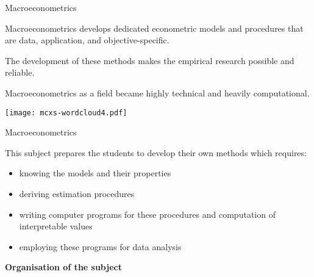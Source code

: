 \documentclass[notes,blackandwhite,mathsans]{beamer}
\begin{document}
{
\begin{frame}{\color{mcxs1}Macroeconometrics}

Macroeconometrics develops dedicated econometric models and procedures that are data, application, and objective-specific.

\bigskip The development of these methods makes the empirical research possible and reliable.
 
\bigskip Macroeconometrics as a field became highly technical and heavily computational.

\end{frame}
}





\begin{frame}

\texttt{[image: mcxs-wordcloud4.pdf]}

\end{frame}




{
\begin{frame}{\color{mcxs1}Macroeconometrics}

\bigskip This subject prepares the students to develop their own methods which requires:

\begin{itemize}
\item {\color{mcxs1}knowing the models} {\color{mcxs2}and their properties}
\item {\color{mcxs1}deriving} {\color{mcxs2}estimation procedures}
\item {\color{mcxs1}writing computer programs} {\color{mcxs2}for these procedures and computation of interpretable values}
\item {\color{mcxs1}employing} {\color{mcxs2}these programs for data analysis}
\end{itemize}

\end{frame}
}










{
\begin{frame}

\begin{adjustwidth}{-0.5cm}{0cm}
\vspace{8.3cm}\Large
\textbf{{\color{mcxs2}Organisation} {\color{mcxs1}of the subject}}
\end{adjustwidth}

\end{frame}
}
\end{document}
